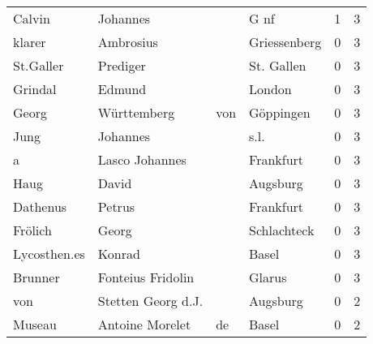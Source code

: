 \begin{center}
\begin{tiny}
\begin{longtabu}{llllrr}
                   Calvin &                           Johannes &             &                                        G nf &          1 &         3 \\
                   klarer &                          Ambrosius &             &                                Griessenberg &          0 &         3 \\
                St.Galler &                           Prediger &             &                                  St. Gallen &          0 &         3 \\
                  Grindal &                             Edmund &             &                                      London &          0 &         3 \\
                    Georg &                        Württemberg &         von &                                   Göppingen &          0 &         3 \\
                     Jung &                           Johannes &             &                                        s.l. &          0 &         3 \\
                        a &                     Lasco Johannes &             &                                   Frankfurt &          0 &         3 \\
                     Haug &                              David &             &                                    Augsburg &          0 &         3 \\
                 Dathenus &                             Petrus &             &                                   Frankfurt &          0 &         3 \\
                  Frölich &                              Georg &             &                                 Schlachteck &          0 &         3 \\
             Lycosthen.es &                             Konrad &             &                                       Basel &          0 &         3 \\
                  Brunner &                  Fonteius Fridolin &             &                                      Glarus &          0 &         3 \\
                      von &                 Stetten Georg d.J. &             &                                    Augsburg &          0 &         2 \\
                   Museau &                    Antoine Morelet &          de &                                       Basel &          0 &         2 \\

\end{longtabu}
\end{tiny}
\end{center}

